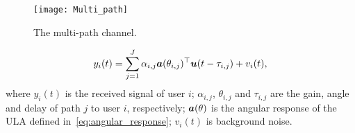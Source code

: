 \documentclass[10pt,twocolumn,twoside]{IEEEtran}
\begin{document}
\begin{figure}[t]
	\centering
	\texttt{[image: Multi\_path]}
	\caption{The multi-path channel.}
	\label{fig:multi_path}
\end{figure}


\begin{equation}\label{eq:cont_channel_mod}
	{y}_i(t) =  \sum_{j=1}^J \alpha_{i,j} \ba(\theta_{i,j})^\Tsf {\bu}(t - \tau_{i,j}) +  v_i(t), %
\end{equation}
where
${y}_i(t)$ is the received signal of user $i$;
$\alpha_{i,j}$,  $\theta_{i,j}$ and $\tau_{i,j}$ are the gain, angle and delay of path $j$ to user $i$, respectively;
${\bm a}(\theta)$ is the angular response of the ULA defined in~\eqref{eq:angular_response};
$v_i(t)$ is background noise.
\end{document}
